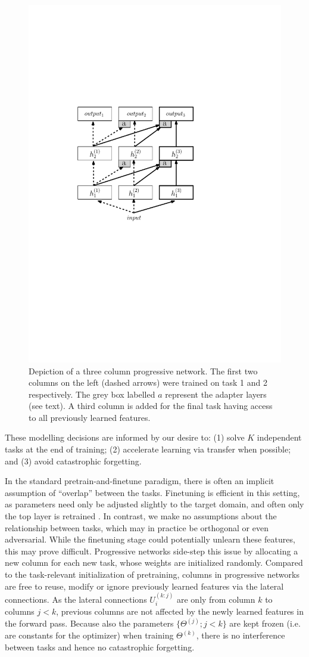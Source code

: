 \begin{figure}[h]
  \centering
    \includegraphics[width=.25\textwidth]{figures/progressiveNetDepiction2}
    \caption{Depiction of a three column progressive network. The first two
columns on the left (dashed arrows) were trained on task 1 and 2 respectively.
The grey box labelled $a$ represent the adapter layers (see text).
A third column is added for the final task having access to all previously learned
features.
    }
    \label{fig:progressiveNet}
\end{figure}

These modelling decisions are informed by our desire to:
(1) solve $K$ independent tasks at the end of training;
(2) accelerate learning via transfer when possible; and
(3) avoid catastrophic forgetting.

In the standard pretrain-and-finetune paradigm, there is often an implicit
assumption of ``overlap'' between the tasks. Finetuning is efficient in this
setting, as parameters need only be adjusted slightly to
the target domain, and often only the top layer is retrained \cite{yosinski-nips2014}. In contrast, we make no assumptions about the
relationship between tasks, which may in practice be orthogonal or even
adversarial. While the finetuning stage could potentially unlearn these
features, this may prove difficult. Progressive networks side-step
this issue by allocating a new column for each new task, whose weights are
initialized randomly. Compared to the task-relevant initialization of pretraining,
columns in progressive networks are free to reuse, modify or ignore previously
learned features via the lateral connections.
As the lateral connections $U_{i}^{(k:j)}$ are only from column $k$ to columns
$j < k$, previous columns are not affected by the newly learned features in the
forward pass.  Because also the parameters $\{ \Theta^{(j)}; j<k\}$
are kept frozen (i.e. are constants for the optimizer) when training $\Theta^{(k)}$,
there is no interference between
tasks and hence no catastrophic forgetting.

